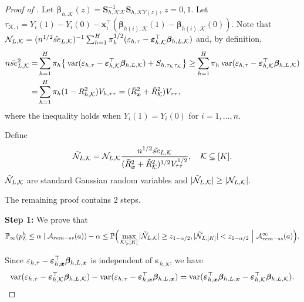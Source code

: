 \documentclass[10pt,a4paper]{amsart}
\newcommand{\Lin}{\textnormal{L}}
\newcommand{\Prob}{\mathbb{P}}
\newcommand{\bs}{\boldsymbol}
\newcommand{\hpL}{p_\textnormal{L}^{\textnormal{h}}}
\newcommand{\mk}{\mathcal{K}}
\newcommand{\remss}{\textnormal{rem-ss}}
\newcommand{\se}{\textnormal{se}}
\newcommand{\var}{\operatorname{var}}
\begin{document}
\begin{proof}[Proof of ]
Let $\bs{\beta}_{h,\mk}(z) = \bs{S}_{h,\mk\mk}^{-1}\bs{S}_{h,\mk Y(z)}$, $z=0,1$. Let $\tau_{\mk, i} = Y_i(1)-Y_i(0)- \bs{x}_i^\top(\bs{\beta}_{h(i),\mk}(1) - \bs{\beta}_{h(i),\mk}(0))$. Note that $\mathcal{N}_{\Lin,\mk} = (n^{1/2}\tilde{\se}_{\Lin,\mk})^{-1}\sum_{h=1}^H \pi_{ h }^{1/2}(\varepsilon_{h,\tau} -\bs{\varepsilon}_{ h, \mk}^\top\bs{\beta}_{ h, \Lin, \mk})$ and, by definition,
\begin{align*}
    n\tilde{\se}_{\Lin,\mk}^2 =& \sum_{h=1}^H \pi_h \big\{\var(\varepsilon_{h,\tau}-\bs{\varepsilon}_{ h, \mk}^\top\bs{\beta}_{ h, \Lin, \mk}) + S_{h,\tau_\mk \tau_\mk}\big\}  \geq  \sum_{h=1}^H \pi_h \var(\varepsilon_{h,\tau}-\bs{\varepsilon}_{ h, \mk}^\top\bs{\beta}_{ h, \Lin, \mk}) \\
    =& \sum_{h=1}^H \pi_{ h }(1-R^2_{ h, \mk}) V_{ h,\tau\tau} = (\bar{R}^2_{\bs{x}} + \tilde{R}^2_{\mk}) V_{ \tau\tau},
\end{align*}
where the inequality holds when $Y_i(1)=Y_i(0)$ for $i=1,\ldots,n$.

Define 
\[
\tilde{\mathcal{N}}_{\Lin,\mk} = \mathcal{N}_{\Lin,\mk} \frac{n^{1/2}\tilde{\se}_{\Lin,\mk}}{(\bar{R}^2_{\bs{x}} + \tilde{R}^2_{\mk})^{1/2} V_{ \tau\tau}^{1/2}},\quad \mk \subseteq [K].
\]
 $\tilde{\mathcal{N}}_{\Lin,\mk}$ are standard Gaussian random variables and $|\tilde{\mathcal{N}}_{\Lin,\mk}| \geq |\mathcal{N}_{\Lin,\mk}|$.

The remaining proof contains $2$ steps. 

\noindent\textbf{Step 1:} We prove that
\[
\Prob_{\infty}(\hpL \leq \alpha \mid \mathcal{A}_{\remss}(a))-\alpha \leq \Prob\Big(\max_{\mk \subsetneq [K]} |\tilde{\mathcal{N}}_{\Lin,\mk}| \geq z_{1-\alpha/2}, |\tilde{\mathcal{N}}_{\Lin,[K]}| < z_{1-\alpha/2}~\Big|~\mathcal{A}_{\remss}^{\infty}(a)\Big).
\]

Since $\varepsilon_{h,\tau} -  \bs{\varepsilon}_{ h, \bs{x}}^\top \bs{\beta}_{h, \Lin , \bs{x}}$ is independent of $\bs{\varepsilon}_{ h, \bs{x}}$, 
we have
\begin{align*}
\var(\varepsilon_{h,\tau}-\bs{\varepsilon}_{ h, \mk}^\top\bs{\beta}_{ h, \Lin, \mk}) - \var(\varepsilon_{h,\tau} -  \bs{\varepsilon}_{ h, \bs{x}}^\top \bs{\beta}_{h, \Lin , \bs{x}}) = \var(\bs{\varepsilon}_{ h, \bs{x}}^\top \bs{\beta}_{h, \Lin , \bs{x}}-\bs{\varepsilon}_{ h, \mk}^\top\bs{\beta}_{ h, \Lin, \mk}).
\end{align*}


\end{proof}
\end{document}
